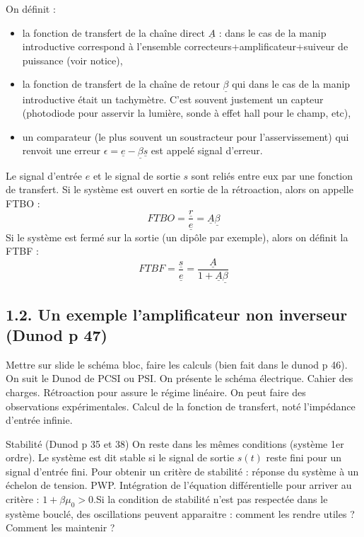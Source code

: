 \documentclass[french, a4paper, 10pt, twocolumn, landscape]{article}
\begin{document}
On définit :
  \begin{itemize}
      \item la fonction de transfert de la chaîne direct $\underline{A}$ : dans le cas de la manip introductive correspond à l'ensemble correcteurs+amplificateur+suiveur de puissance (voir notice),
      \item la fonction de transfert de la chaîne de retour $\underline{\beta}$ qui dans le cas de la manip introductive était un tachymètre. C'est souvent justement un capteur (photodiode pour asservir la lumière, sonde à effet hall pour le champ, etc),
      \item un comparateur (le plus souvent un soustracteur pour l'asservissement) qui renvoit une erreur $\epsilon = \underline{e}-\underline{\beta}\underline{s}$ est appelé signal d'erreur.
  \end{itemize}
  Le signal d'entrée $e$ et le signal de sortie $s$ sont reliés entre eux par une fonction de transfert. Si le système est ouvert en sortie de la rétroaction, alors on appelle FTBO :
  \begin{equation}
      FTBO = \frac{\underline{r}}{\underline{e}} = \underline{A}\underline{\beta}
  \end{equation}
  Si le système est fermé sur la sortie (un dipôle par exemple), alors on définit la FTBF :
  \begin{equation}
      FTBF = \frac{\underline{s}}{\underline{e}} = \frac{\underline{A}}{1+\underline{A}\underline{\beta}}
  \end{equation}


\subsection*{1.2. Un exemple l'amplificateur non inverseur (Dunod p 47)}

Mettre sur slide le schéma bloc, faire les calculs (bien fait dans le dunod p 46). On suit le Dunod de PCSI ou PSI. On présente le schéma électrique. Cahier des charges. Rétroaction pour assure le régime linéaire. On peut faire des observations expérimentales. Calcul de la fonction de transfert, noté l'impédance d'entrée infinie.\medskip

Stabilité (Dunod p 35 et 38)
On reste dans les mêmes conditions (système 1er ordre). Le système est dit stable si le signal de sortie $s(t)$ reste fini pour un signal d’entrée fini. Pour obtenir un critère de stabilité : réponse du système à un échelon de tension. PWP. Intégration de l’équation différentielle pour arriver au critère : $1 + \beta \mu_0 > 0$.Si la condition de stabilité n’est pas respectée dans le système bouclé, des oscillations peuvent apparaitre : comment les rendre utiles ? Comment les maintenir ? 
\end{document}

